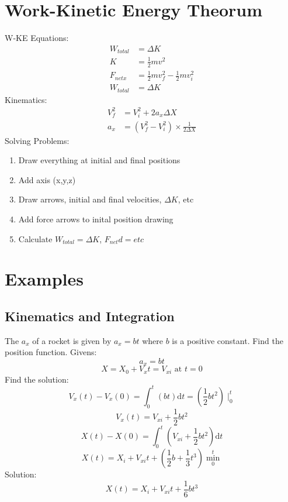 \documentclass[8pt, twocolumn]{article}
\begin{document}
\section{Work-Kinetic Energy Theorum}
	W-KE Equations:
	\[\begin{aligned}
		W_{total} &= \Delta K \\
		K &= \frac{1}{2}mv^2 \\
		F_{netx} &= \frac{1}{2}mv_f^2 - \frac{1}{2}mv_i^2 \\
		W_{total} &= \Delta K 
	\end{aligned}\]
	\newline
	Kinematics:
	\[\begin{aligned}
		V_f^2 &= V_i^2 + 2a_x\Delta X \\
		a_x &= (V_f^2 - V_i^2) \times \frac{1}{2 \Delta X}
	\end{aligned}\]
	\newline
	Solving Problems:
	\begin{enumerate}
		\item Draw everything at initial and final positions
		\item Add axis (x,y,z)
		\item Draw arrows, initial and final velocities, $\Delta K$, etc
		\item Add force arrows to inital position drawing
		\item Calculate $W_{total} = \Delta K$, $F_{net} d = etc$
	\end{enumerate}

\section{Examples}
\subsection{Kinematics and Integration}

	The $a_x$ of a rocket is given by $ a_x = bt $ where $b$ is a positive constant. Find the position function.
	\newline
	Givens:
	\[ a_x = bt \]
	\[ X = X_0 + V_x t = V_{xi} \text{ at } t = 0 \]
	\newline
	Find the solution:
	\[V_x(t) - V_x(0) = \int_{0}^{t}(bt) \mathrm{d}t = (\frac{1}{2} bt^2)\mid_{0}^{t}\]
	\[V_x(t) = V_{xi} + \frac{1}{2} bt^2\]
	\[X(t) - X(0) = \int_{0}^{t}(V_{xi} + \frac{1}{2}bt^2) \mathrm{d}t\]
	\[X(t) = X_i + V_{xi} t + (\frac{1}{2}b + \frac{1}{3}t^3)\min_{0}^{t}\]
	Solution:
	\[X(t) = X_i + V_{xi}t + \frac{1}{6}bt^3\]
\end{document}
